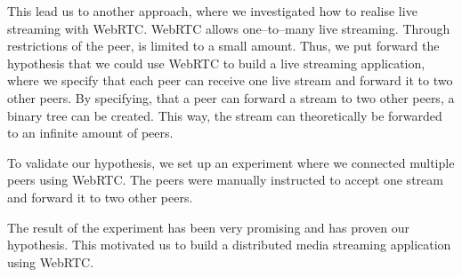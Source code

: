 This lead us to another approach, where we investigated how to realise live streaming with WebRTC. WebRTC allows one–to–many live streaming. Through restrictions of the peer,  is limited to a small amount. Thus, we put forward the hypothesis that we could use WebRTC to build a live streaming application, where we specify that each peer can receive one live stream and forward it to two other peers. By specifying, that a peer can forward a stream to two other peers, a binary tree can be created. This way, the stream can theoretically be forwarded to an infinite amount of peers.

To validate our hypothesis, we set up an experiment where we connected multiple peers using WebRTC. The peers were manually instructed to accept one stream and forward it to two other peers. 

The result of the experiment has been very promising and has proven our hypothesis. This motivated us to build a distributed media streaming application using WebRTC. 

